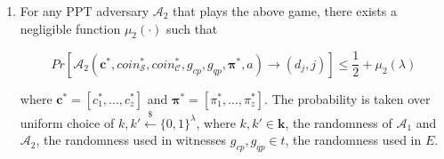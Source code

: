 \begin{definition}[RC-S-P Privacy]
\begin{enumerate}
\item For any PPT adversary $\mathcal{A}_{\scriptscriptstyle 2}$ that plays the above game, there exists a negligible function $\mu_{\scriptscriptstyle 2}(\cdot)$ such that



{\small
$$ Pr\left[\mathcal{A}_{\scriptscriptstyle 2}(\bm{c}^{\scriptscriptstyle *},coin^{\scriptscriptstyle *}_{\scriptscriptstyle \mathcal S},coin^{\scriptscriptstyle *}_{\scriptscriptstyle\mathcal C}, g_{\scriptscriptstyle cp},  g_{\scriptscriptstyle qp},\bm{\pi}^{\scriptscriptstyle *},a)\rightarrow (d_{\scriptscriptstyle j},j)\right]\leq \frac{1}{2}+ \mu_{\scriptscriptstyle 2}(\lambda)$$
}

where $\bm{c}^{\scriptscriptstyle *}=[{c}^{\scriptscriptstyle *}_{\scriptscriptstyle 1},...,{c}^{\scriptscriptstyle *}_{\scriptscriptstyle z}]$ and $\bm{\pi}^{\scriptscriptstyle *}=[\pi^{\scriptscriptstyle *}_{\scriptscriptstyle 1},...,\pi^{\scriptscriptstyle *}_{\scriptscriptstyle z}]$.  The probability is taken over uniform  choice of $k,k'\stackrel{\scriptscriptstyle\$}\leftarrow \{0,1\}^{\scriptscriptstyle\lambda}$, where $k,k'\in\bm{k}$, the randomness of $\mathcal{A}_{\scriptscriptstyle 1}$ and $\mathcal{A}_{\scriptscriptstyle 2}$,  the randomness used in witnesses $g_{\scriptscriptstyle cp},g_{\scriptscriptstyle qp}\in t$,  the randomness used in  $E$.

\end{enumerate}
\end{definition}
 
 
 
%
 
